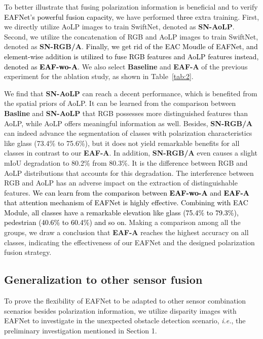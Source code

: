 \documentclass{osa-article}
\newcommand{\YKL}[1]{\textcolor{black}{#1}}
\begin{document}
To better illustrate that fusing polarization information is beneficial and to verify \YKL{EAFNet's powerful fusion capacity,}
we have performed \YKL{three} extra training.
First, we directly utilize AoLP images to train SwiftNet, denoted as \textbf{SN-AoLP}.
Second, we utilize the concatenation of RGB and AoLP images to train SwiftNet, denoted as \textbf{SN-RGB/A}.
\YKL{Finally, we get rid of the EAC Moudle of EAFNet, and element-wise addition is utilized to fuse RGB features and AoLP features instead, denoted as \textbf{EAF-wo-A}.}
We also select \textbf{Baseline} and \textbf{EAF-A} of the previous experiment for the ablation study, as shown in Table~\ref{tab:2}.

We find that \textbf{SN-AoLP} can reach a decent performance, which is benefited from the spatial priors of AoLP.
It can be learned from the comparison between \textbf{Basline} and \textbf{SN-AoLP} that RGB possesses more distinguished features than AoLP, while AoLP offers meaningful information as well.
Besides, \textbf{SN-RGB/A} can indeed advance the segmentation of classes with polarization characteristics like glass (73.4\% to 75.6\%), but it does not yield remarkable benefits for all classes in contrast \YKL{to} our \textbf{EAF-A}.
In addition, \textbf{SN-RGB/A} even causes a slight mIoU degradation to 80.2\% from 80.3\%.
It is the difference between RGB and AoLP distributions that accounts for this degradation.
The interference between RGB and AoLP has an adverse impact on the extraction of distinguishable features.
\YKL{We can learn from the comparison between \textbf{EAF-wo-A} and \textbf{EAF-A} that attention mechanism of EAFNet is highly effective. Combining with EAC Module, all classes have a remarkable elevation like glass (75.4\% to 79.3\%), pedestrian (40.6\% to 60.4\%) and so on.}
Making a comparison among all the groups, we draw a conclusion that \textbf{EAF-A} reaches the highest accuracy on all classes, indicating the effectiveness of our EAFNet and the designed polarization fusion strategy. 

\subsection{Generalization to other sensor fusion}
To prove the flexibility of EAFNet to be adapted to other sensor combination scenarios besides polarization information, we utilize disparity images with EAFNet to investigate in the unexpected obstacle detection scenario, \textit{i.e.}, the preliminary investigation mentioned in Section 1.
\end{document}
